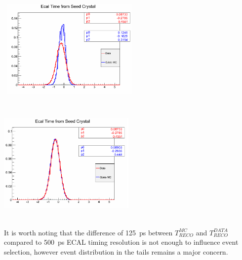\begin{center}
\centering
\mbox{
\includegraphics[height=6cm, width=0.5\textwidth]{THESISPLOTS/MC_Vs_DataTimeB4Calib.png}
\includegraphics[height=6cm, width=0.5\textwidth]{THESISPLOTS/MC_Vs_DataTimeAferCalib.png}
}
\label{fig:DATAMCTime}
\end{center}
It is worth noting that the difference of 125~ps between $T^{MC}_{RECO}$ and $T^{DATA}_{RECO}$ compared to 500~ps ECAL timing resolution is not enough to influence event selection, however event distribution in the tails remains a major concern.
